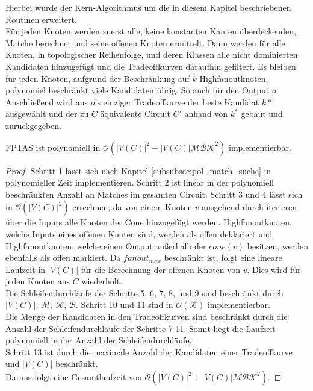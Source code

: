 \documentclass[11pt, a4paper, german]{article}
\begin{document}
Hierbei wurde der Kern-Algorithmus um die in diesem Kapitel beschriebenen Routinen erweitert. \\
Für jeden Knoten werden zuerst alle, keine konstanten Kanten überdeckenden, Matche berechnet und seine offenen Knoten ermittelt. Dann werden für alle Knoten, in topologischer Reihenfolge, und deren Klassen alle nicht dominierten Kandidaten hinzugefügt und die Tradeoffkurven daraufhin gefiltert. Es bleiben für jeden Knoten, aufgrund der Beschränkung auf $k$ Highfanoutknoten, polynomiel beschränkt viele Kandidaten übrig. So auch für den Output $o$. Anschließend wird aus $o$'s einziger Tradeoffkurve der beste Kandidat $k*$ ausgewählt und der zu $C$ äquivalente Circuit $C'$ anhand von $k^*$ gebaut und zurückgegeben.

\begin{lemma}
	FPTAS ist polynomiell in $\mathcal{O}(|V(C)|^2 + |V(C)|\mathcal{MBK}^2)$ implementierbar.
\end{lemma}
\begin{proof}
Schritt 1 lässt sich nach Kapitel \ref{subsubsec:pol_match_suche} in polynomieller Zeit implementieren. Schritt 2 ist linear in der polynomiell beschränkten Anzahl an Matches im gesamten Circuit.  Schritt 3 und  4 lässt sich in $\mathcal{O}(|V(C)|^2)$ errechnen, da von einem Knoten $v$ ausgehend durch iterieren über die Inputs alle Knoten der Cone hinzugefügt werden.  Highfanoutknoten, welche Inputs eines offenen Knoten sind, werden als offen deklariert und Highfanoutknoten, welche einen Output außerhalb der $cone(v)$ besitzen, werden ebenfalls als offen markiert. Da $fanout_{max}$ beschränkt ist, folgt eine lineare Laufzeit in $|V(C)|$ für die Berechnung der offenen Knoten von $v$. Dies wird für jeden Knoten aus $C$ wiederholt. \\
Die  Schleifendurchläufe der Schritte 5, 6, 7, 8,  und 9 sind beschränkt durch $|V(C)|$, $\mathcal{M}$,  $\mathcal{K}$, $\mathcal{B}$. Schritt 10 und 11 sind in $\mathcal{O}(\mathcal{K})$ implementierbar.\\
Die Menge der Kandidaten in den Tradeoffkurven sind beschränkt durch die Anzahl der Schleifendurchläufe der Schritte 7-11.  Somit liegt die Laufzeit polynomiell in der Anzahl der Schleifendurchläufe. \\
Schritt 13 ist durch die maximale Anzahl der Kandidaten einer Tradeoffkurve und $|V(C)|$ beschränkt.\\
Daraus folgt eine Gesamtlaufzeit von $\mathcal{O}(|V(C)|^2 + |V(C)|\mathcal{MBK}^2)$.
\end{proof}
\end{document}
